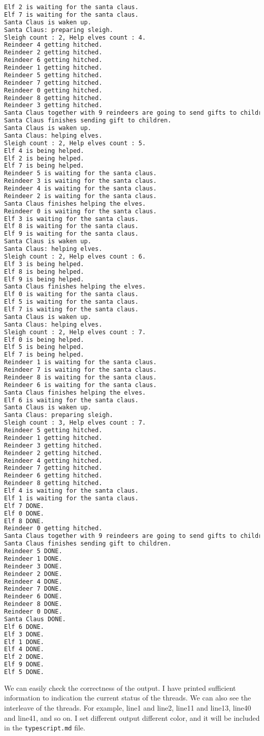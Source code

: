 \begin{lstlisting}[language=bash]
Elf 2 is waiting for the santa claus.
Elf 7 is waiting for the santa claus.
Santa Claus is waken up.
Santa Claus: preparing sleigh.
Sleigh count : 2, Help elves count : 4.
Reindeer 4 getting hitched.
Reindeer 2 getting hitched.
Reindeer 6 getting hitched.
Reindeer 1 getting hitched.
Reindeer 5 getting hitched.
Reindeer 7 getting hitched.
Reindeer 0 getting hitched.
Reindeer 8 getting hitched.
Reindeer 3 getting hitched.
Santa Claus together with 9 reindeers are going to send gifts to children around the world.
Santa Claus finishes sending gift to children.
Santa Claus is waken up.
Santa Claus: helping elves.
Sleigh count : 2, Help elves count : 5.
Elf 4 is being helped.
Elf 2 is being helped.
Elf 7 is being helped.
Reindeer 5 is waiting for the santa claus.
Reindeer 3 is waiting for the santa claus.
Reindeer 4 is waiting for the santa claus.
Reindeer 2 is waiting for the santa claus.
Santa Claus finishes helping the elves.
Reindeer 0 is waiting for the santa claus.
Elf 3 is waiting for the santa claus.
Elf 8 is waiting for the santa claus.
Elf 9 is waiting for the santa claus.
Santa Claus is waken up.
Santa Claus: helping elves.
Sleigh count : 2, Help elves count : 6.
Elf 3 is being helped.
Elf 8 is being helped.
Elf 9 is being helped.
Santa Claus finishes helping the elves.
Elf 0 is waiting for the santa claus.
Elf 5 is waiting for the santa claus.
Elf 7 is waiting for the santa claus.
Santa Claus is waken up.
Santa Claus: helping elves.
Sleigh count : 2, Help elves count : 7.
Elf 0 is being helped.
Elf 5 is being helped.
Elf 7 is being helped.
Reindeer 1 is waiting for the santa claus.
Reindeer 7 is waiting for the santa claus.
Reindeer 8 is waiting for the santa claus.
Reindeer 6 is waiting for the santa claus.
Santa Claus finishes helping the elves.
Elf 6 is waiting for the santa claus.
Santa Claus is waken up.
Santa Claus: preparing sleigh.
Sleigh count : 3, Help elves count : 7.
Reindeer 5 getting hitched.
Reindeer 1 getting hitched.
Reindeer 3 getting hitched.
Reindeer 2 getting hitched.
Reindeer 4 getting hitched.
Reindeer 7 getting hitched.
Reindeer 6 getting hitched.
Reindeer 8 getting hitched.
Elf 4 is waiting for the santa claus.
Elf 1 is waiting for the santa claus.
Elf 7 DONE.
Elf 0 DONE.
Elf 8 DONE.
Reindeer 0 getting hitched.
Santa Claus together with 9 reindeers are going to send gifts to children around the world.
Santa Claus finishes sending gift to children.
Reindeer 5 DONE.
Reindeer 1 DONE.
Reindeer 3 DONE.
Reindeer 2 DONE.
Reindeer 4 DONE.
Reindeer 7 DONE.
Reindeer 6 DONE.
Reindeer 8 DONE.
Reindeer 0 DONE.
Santa Claus DONE.
Elf 6 DONE.
Elf 3 DONE.
Elf 1 DONE.
Elf 4 DONE.
Elf 2 DONE.
Elf 9 DONE.
Elf 5 DONE.
\end{lstlisting}

We can easily check the correctness of the output. I have printed sufficient information to indication the current status of the threads. 
We can also see the interleave of the threads. For example, line1 and line2, line11 and line13, line40 and line41, and so on.
I set different output different color, and it will be included in the \texttt{typescript.md} file.
